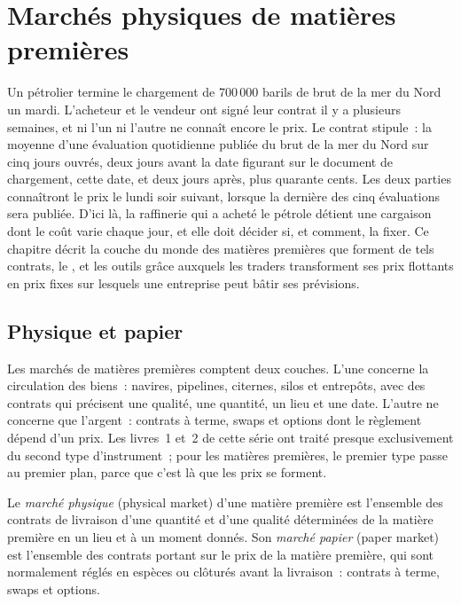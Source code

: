 \chapter{Marchés physiques de matières premières}\label{ch:m3:physical-commodity-markets}

Un pétrolier termine le chargement de 700\,000 barils de brut de la mer du Nord un mardi.
L'acheteur et le vendeur ont signé leur contrat il y a plusieurs semaines, et ni l'un ni l'autre
ne connaît encore le prix. Le contrat stipule~: la moyenne d'une évaluation quotidienne publiée
du brut de la mer du Nord sur cinq jours ouvrés, deux jours avant la date figurant sur le
document de chargement, cette date, et deux jours après, plus quarante cents. Les deux parties
connaîtront le prix le lundi soir suivant, lorsque la dernière des cinq
évaluations sera publiée. D'ici là, la raffinerie qui a acheté le pétrole détient une cargaison dont le coût
varie chaque jour, et elle doit décider si, et comment, la fixer. Ce chapitre décrit la couche
du monde des matières premières que forment de tels contrats, le , et les outils
grâce auxquels les traders transforment ses prix flottants en prix fixes sur lesquels une
entreprise peut bâtir ses prévisions.

\section{Physique et papier}

Les marchés de matières premières comptent deux couches. L'une concerne la circulation des biens~: navires, pipelines, citernes,
silos et entrepôts, avec des contrats qui précisent une qualité, une quantité, un lieu
et une date. L'autre ne concerne que l'argent~: contrats à terme, swaps et options dont
le règlement dépend d'un prix. Les livres~1 et~2 de cette série ont traité presque
exclusivement du second type d'instrument~; pour les matières premières, le premier type passe au premier plan,
parce que c'est là que les prix se forment.

\begin{definition}\label{def:m3:physical-commodity-markets:layers}
Le \emph{marché physique} (physical market) d'une matière première est l'ensemble des
contrats de livraison d'une quantité et d'une qualité déterminées de la matière première en
un lieu et à un moment donnés. Son \emph{marché papier} (paper market) est l'ensemble
des contrats portant sur le prix de la matière première, qui sont normalement réglés en espèces ou clôturés
avant la livraison~: contrats à terme, swaps et options.
\end{definition}

